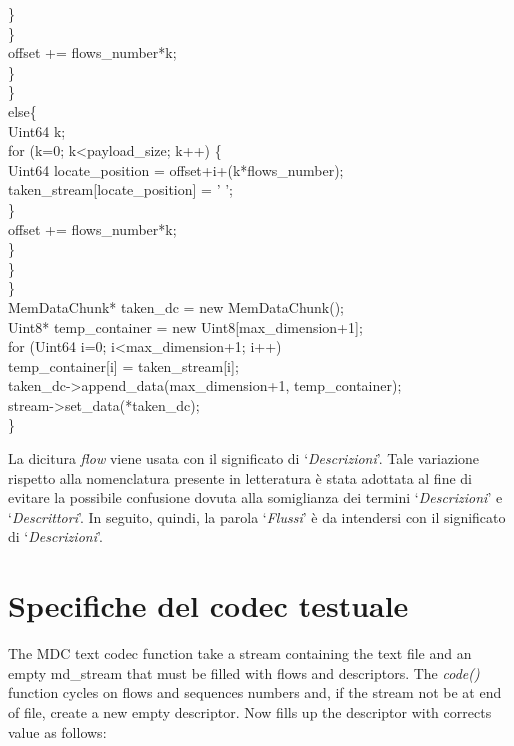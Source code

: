 \begin{code}
						\}\\
					\}\\
					offset += flows\_number*k;\\
				\}\\
			\}\\
			else\{\\
				Uint64 k;\\
				for (k=0; k<payload\_size; k++) \{\\
					Uint64 locate\_position = offset+i+(k*flows\_number);\\
					taken\_stream[locate\_position] = ' ';\\
				\}\\
				offset += flows\_number*k;\\
			\}\\
		\}\\
	\}\\
	MemDataChunk* taken\_dc = new MemDataChunk();\\
	Uint8* temp\_container = new Uint8[max\_dimension+1];\\
	for (Uint64 i=0; i<max\_dimension+1; i++)\\
		temp\_container[i] = taken\_stream[i];\\
	taken\_dc->append\_data(max\_dimension+1, temp\_container);\\
	stream->set\_data(*taken\_dc);\\
\}\\
\end{code}

\begin{notabene}
La dicitura \textit{flow} viene usata con il significato di
`\emph{Descrizioni}'. Tale variazione rispetto alla nomenclatura presente in
letteratura è stata adottata al fine di evitare la possibile confusione dovuta alla somiglianza dei termini `\emph{Descrizioni}' e `\emph{Descrittori}'. In seguito, quindi, la parola `\emph{Flussi}' è da intendersi con il significato di `\emph{Descrizioni}'.
\end{notabene}

\section{Specifiche del codec testuale}
\label{sec:spec-text}
The MDC text codec function take a stream containing the text file and an empty
md\_stream that must be filled with flows and descriptors. The \textit{code()}
function cycles on flows and sequences numbers and, if the stream not be at end of file, create a new empty descriptor.
Now fills up the descriptor with corrects value as follows: 

